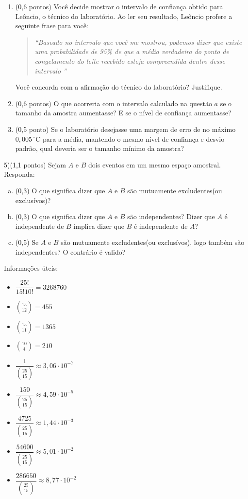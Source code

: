 \documentclass[12pt]{article}
\begin{document}
\begin{enumerate}[a)]
\begin{enumerate}
    \item(0,6 pontos) Você decide mostrar o intervalo de confiança obtido para Leôncio, o técnico do laboratório. Ao ler seu resultado, Leôncio profere a seguinte frase para você:
    
    \begin{quote}
\textit{“Baseado no intervalo que você me mostrou, podemos dizer que existe uma probabilidade de 95\% de que a média verdadeira do ponto de congelamento do leite recebido esteja compreendida dentro desse intervalo ”}
\end{quote}

    Você concorda com a afirmação do técnico do laboratório? Justifique. 

    \item (0,6 pontos) O que ocorreria com o intervalo calculado na questão $a$ se o tamanho da amostra aumentasse? E se o nível de confiança aumentasse?
    

    \item (0,5 ponto) Se o laboratório desejasse uma margem de erro de no máximo \( 0{,}005\,^\circ\mathrm{C} \) para a média, mantendo o mesmo nível de confiança e desvio padrão, qual deveria ser o tamanho mínimo da amostra?
\end{enumerate}

\vspace{5px}

5)(1,1 pontos) Sejam $A$ e $B$ dois eventos em um mesmo espaço amostral. Responda:

\begin{enumerate}[a)]
    \item (0,3) O que significa dizer que $A$ e $B$ são mutuamente excludentes(ou exclusívos)?
    \item (0,3) O que significa dizer que $A$ e $B$ são independentes? Dizer que $A$ é independente de $B$ implica dizer que $B$ é independente de $A$?
    \item (0,5) Se $A$ e $B$ são mutuamente excludentes(ou exclusívos), logo também são independentes? O contrário é valido?
\end{enumerate}
Informações úteis: 
\begin{itemize}
    \item $\dfrac{25!}{15!10!} = 3268760$
    \item $\binom{15}{12} = 455$
    \item $\binom{15}{11} = 1365$
    \item  $\binom{10}{4} = 210$
    \item $\dfrac{1}{\binom{25}{15}} \approx 3,06 \cdot 10^{-7}$
    \item $\dfrac{150}{\binom{25}{15}} \approx 4,59 \cdot 10^{-5}$
    \item $\dfrac{4725}{\binom{25}{15}} \approx 1,44 \cdot 10^{-3}$
    \item $\dfrac{54600}{\binom{25}{15}} \approx 5,01 \cdot 10^{-2}$
    \item $\dfrac{286650}{\binom{25}{15}} \approx 8,77 \cdot 10^{-2}$
\end{itemize}


\end{enumerate}
\end{document}
